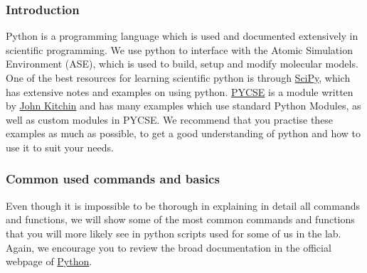 \documentclass[11pt]{article}
\begin{document}
\subsubsection{Introduction}
\label{sec:orge122af2}
Python is a programming language which is used and documented extensively in scientific programming. We use python to interface with the Atomic Simulation Environment (ASE), which is used to build, setup and modify molecular models.
One of the best resources for learning scientific python is through \href{http://www.scipy-lectures.org/}{SciPy}, which has extensive notes and examples on using python. \href{http://kitchingroup.cheme.cmu.edu/pycse/pycse.html}{PYCSE} is a module written by \href{http://kitchingroup.cheme.cmu.edu/}{John Kitchin} and has many examples which use standard Python Modules, as well as custom modules in PYCSE. We recommend that you practise these examples as much as possible, to get a good understanding of python and how to use it to suit your needs. 
\subsubsection{Common used commands and basics}
\label{sec:orgcc88c10}
Even though it is impossible to be thorough in explaining in detail all commands and functions, we will show some of the most common commands and functions that you will more likely see in python scripts used for some of us in the lab. Again, we encourage you to review the broad documentation in the official webpage of \href{https://docs.python.org/2/}{Python}. 
\end{document}
